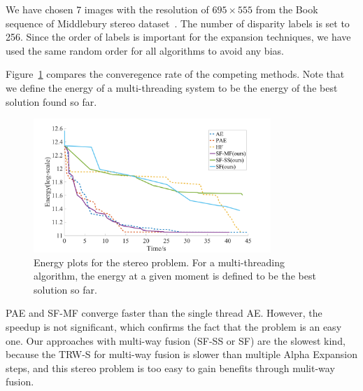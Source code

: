 
\noindent We have chosen 7 images with the resolution of $695\times555$
from the Book sequence of Middlebury stereo
dataset~\cite{middlebury_stereo}. The number of disparity labels is set
to 256.
%
Since the order of labels is important for the expansion techniques,
we have used the same random order for all algorithms to avoid any
bias. 
%

Figure~\ref{fig:stereo_global} compares the converegence rate of the
competing methods. Note that we define the energy of a multi-threading
system to be the energy of the best solution found so far.
%
\begin{figure}[tb]
\centering
\includegraphics[width=0.8\textwidth]{figure/stereo_global.png}
\caption{Energy plots for the stereo problem. For a multi-threading algorithm, the energy at a given moment is
defined to be the best solution so far.}
\label{fig:stereo_global}
\end{figure}
%
PAE and SF-MF converge faster than the single thread AE. However, the
speedup is not significant, which confirms the fact that the problem
is an easy one.
Our approaches with multi-way fusion (SF-SS or SF) are the slowest
kind, because the TRW-S for multi-way fusion is slower than multiple
Alpha Expansion steps, and this stereo problem is too easy to gain
benefits through mulit-way fusion.
%
